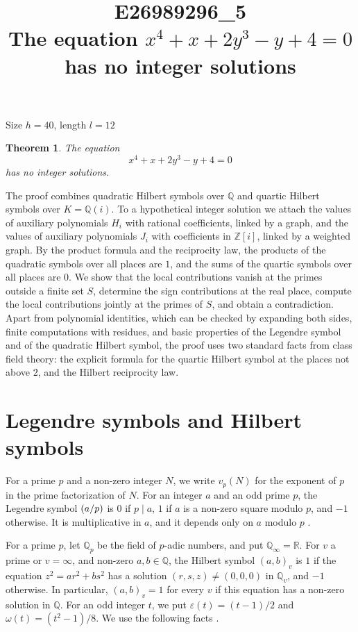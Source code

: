 \documentclass[11pt]{article}
\title{\textbf{E26989296\_5}\\[4pt] {\Large The equation $x^{4}+x+2y^{3}-y+4=0$ has no integer solutions}}
\author{}
\date{}
\newtheorem{theorem}{Theorem}
\newcommand{\Z}{\mathbb{Z}}
\newcommand{\Q}{\mathbb{Q}}
\newcommand{\leg}[2]{\mathchoice{\biggl(\dfrac{#1}{#2}\biggr)}{(#1/#2)}{(#1/#2)}{(#1/#2)}}
\begin{document}
\maketitle
\vspace{-8ex}
\begin{center}
Size $h=40$, length $l=12$
\end{center}

\begin{theorem}\label{thm:main}
The equation
\begin{equation}\label{eq:main}
x^{4}+x+2y^{3}-y+4=0
\end{equation}
has no integer solutions.
\end{theorem}

The proof combines quadratic Hilbert symbols over $\Q$ and quartic Hilbert symbols over $K=\Q(i)$. To a hypothetical integer solution we attach the values of auxiliary polynomials $H_i$ with rational coefficients, linked by a graph, and the values of auxiliary polynomials $J_i$ with coefficients in $\Z[i]$, linked by a weighted graph. By the product formula and the reciprocity law, the products of the quadratic symbols over all places are $1$, and the sums of the quartic symbols over all places are $0$. We show that the local contributions vanish at the primes outside a finite set $S$, determine the sign contributions at the real place, compute the local contributions jointly at the primes of $S$, and obtain a contradiction. Apart from polynomial identities, which can be checked by expanding both sides, finite computations with residues, and basic properties of the Legendre symbol and of the quadratic Hilbert symbol, the proof uses two standard facts from class field theory: the explicit formula for the quartic Hilbert symbol at the places not above $2$, and the Hilbert reciprocity law.

\section{Legendre symbols and Hilbert symbols}

For a prime $p$ and a non-zero integer $N$, we write $v_p(N)$ for the exponent of $p$ in the prime factorization of $N$. For an integer $a$ and an odd prime $p$, the Legendre symbol $\leg{a}{p}$ is $0$ if $p\mid a$, $1$ if $a$ is a non-zero square modulo $p$, and $-1$ otherwise. It is multiplicative in $a$, and it depends only on $a$ modulo $p$ \cite[Chapter~5]{IR}.

For a prime $p$, let $\Q_p$ be the field of $p$-adic numbers, and put $\Q_\infty=\mathbb R$. For $v$ a prime or $v=\infty$, and non-zero $a,b\in\Q$, the Hilbert symbol $(a,b)_v$ is $1$ if the equation $z^2=ar^2+bs^2$ has a solution $(r,s,z)\neq(0,0,0)$ in $\Q_v$, and $-1$ otherwise. In particular, $(a,b)_v=1$ for every $v$ if this equation has a non-zero solution in $\Q$. For an odd integer $t$, we put $\varepsilon(t)=(t-1)/2$ and $\omega(t)=(t^2-1)/8$. We use the following facts \cite[Chapter~III, Proposition~2 and Theorems~1 and~3]{Se}.
\end{document}
